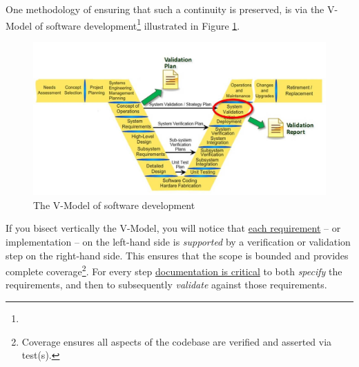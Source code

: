 One methodology of ensuring that such a continuity is preserved, is via the V-Model of software development\footnote{} illustrated in Figure \ref{fig:v-model}.


\begin{figure}[!h] %
\begin{center}
\includegraphics[scale=0.52]{figures/v_diagram_-_validation_plan2.png}
\end{center}
\caption{The V-Model of software development}
\label{fig:v-model}
\end{figure}

\pagebreak

If you bisect vertically the V-Model, you will notice that \underline{each requirement} -- or implementation -- on the left-hand side is \emph{supported} by a verification or validation step on the right-hand side.  This ensures that the scope is bounded and provides complete coverage\footnote{Coverage ensures all aspects of the codebase are verified and asserted via test(s).}.  For every step \underline{documentation is critical} to both \emph{specify} the requirements, and then to subsequently \emph{validate} against those requirements.




